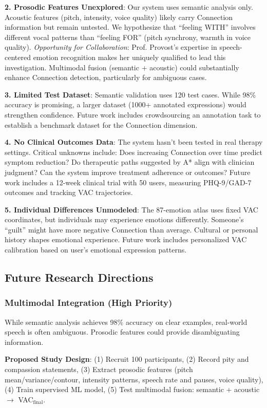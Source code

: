 \textbf{2. Prosodic Features Unexplored}: Our system uses semantic analysis only. Acoustic features (pitch, intensity, voice quality) likely carry Connection information but remain untested. We hypothesize that ``feeling WITH'' involves different vocal patterns than ``feeling FOR'' (pitch synchrony, warmth in voice quality). \textit{Opportunity for Collaboration}: Prof. Provost's expertise in speech-centered emotion recognition makes her uniquely qualified to lead this investigation. Multimodal fusion (semantic + acoustic) could substantially enhance Connection detection, particularly for ambiguous cases.

\textbf{3. Limited Test Dataset}: Semantic validation uses 120 test cases. While 98\% accuracy is promising, a larger dataset (1000+ annotated expressions) would strengthen confidence. Future work includes crowdsourcing an annotation task to establish a benchmark dataset for the Connection dimension.

\textbf{4. No Clinical Outcomes Data}: The system hasn't been tested in real therapy settings. Critical unknowns include: Does increasing Connection over time predict symptom reduction? Do therapeutic paths suggested by A* align with clinician judgment? Can the system improve treatment adherence or outcomes? Future work includes a 12-week clinical trial with 50 users, measuring PHQ-9/GAD-7 outcomes and tracking VAC trajectories.

\textbf{5. Individual Differences Unmodeled}: The 87-emotion atlas uses fixed VAC coordinates, but individuals may experience emotions differently. Someone's ``guilt'' might have more negative Connection than average. Cultural or personal history shapes emotional experience. Future work includes personalized VAC calibration based on user's emotional expression patterns.

\subsection{Future Research Directions}

\subsubsection{Multimodal Integration (High Priority)}

While semantic analysis achieves 98\% accuracy on clear examples, real-world speech is often ambiguous. Prosodic features could provide disambiguating information.

\textbf{Proposed Study Design}: (1) Recruit 100 participants, (2) Record pity and compassion statements, (3) Extract prosodic features (pitch mean/variance/contour, intensity patterns, speech rate and pauses, voice quality), (4) Train supervised ML model, (5) Test multimodal fusion: semantic + acoustic $\rightarrow$ VAC$_{\text{final}}$.

